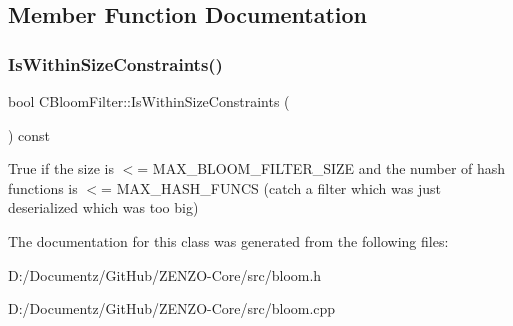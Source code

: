 \subsection{Member Function Documentation}
\mbox{\label{class_c_bloom_filter_a06f2094da8e7d9c6ad4ea426858e32de}} 
\subsubsection{\texorpdfstring{IsWithinSizeConstraints()}{IsWithinSizeConstraints()}}
{\footnotesize\ttfamily bool C\+Bloom\+Filter\+::\+Is\+Within\+Size\+Constraints (\begin{DoxyParamCaption}{ }\end{DoxyParamCaption}) const}

True if the size is $<$= M\+A\+X\+\_\+\+B\+L\+O\+O\+M\+\_\+\+F\+I\+L\+T\+E\+R\+\_\+\+S\+I\+ZE and the number of hash functions is $<$= M\+A\+X\+\_\+\+H\+A\+S\+H\+\_\+\+F\+U\+N\+CS (catch a filter which was just deserialized which was too big) 

The documentation for this class was generated from the following files\+:\begin{DoxyCompactItemize}
\item 
D\+:/\+Documentz/\+Git\+Hub/\+Z\+E\+N\+Z\+O-\/\+Core/src/bloom.\+h\item 
D\+:/\+Documentz/\+Git\+Hub/\+Z\+E\+N\+Z\+O-\/\+Core/src/bloom.\+cpp\end{DoxyCompactItemize}
